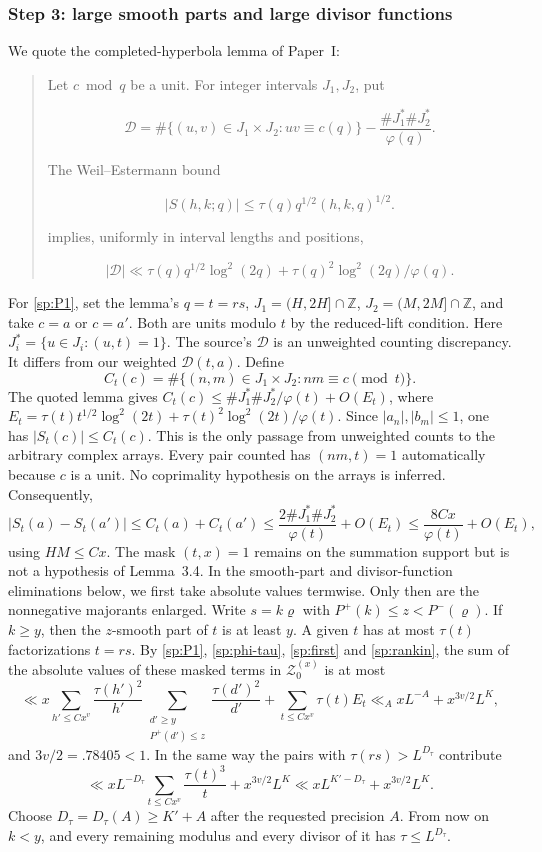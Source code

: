 \subsubsection*{Step 3: large smooth parts and large divisor functions}
We quote the completed-hyperbola lemma of Paper~I:
\begin{quote}
Let $c\bmod q$ be a unit. For integer
intervals $J_1,J_2$, put

\[
\mathcal D=\#\{(u,v)\in J_1\times J_2:uv\equiv c(q)\}
       -\frac{\#J_1^*\#J_2^*}{\varphi(q)}.
\tag{3.107}
\]

The Weil--Estermann bound \cite{Weil48,Estermann61}

\[
|S(h,k;q)|\le\tau(q)q^{1/2}(h,k,q)^{1/2}.
\tag{3.108}
\]

implies, uniformly in interval lengths and positions,

\[
|\mathcal D|\ll\tau(q)q^{1/2}\log^2(2q)
        +\tau(q)^2\log^2(2q)/\varphi(q).
\tag{3.109}
\]
\end{quote}
For \eqref{sp:P1}, set the lemma's $q=t=rs$,
$J_1=(H,2H]\cap\mathbb Z$, $J_2=(M,2M]\cap\mathbb Z$, and take
$c=a$ or $c=a'$. Both are units modulo $t$ by the reduced-lift condition.
Here $J_i^*=\{u\in J_i:(u,t)=1\}$. The source's $\mathcal D$ is an
unweighted counting discrepancy. It differs from our weighted
$\mathcal D(t,a)$. Define
\[
 C_t(c)=\#\{(n,m)\in J_1\times J_2:nm\equiv c\pmod t\}.
\]
The quoted lemma gives
$C_t(c)\le\#J_1^*\#J_2^*/\varphi(t)+O(E_t)$, where
$E_t=\tau(t)t^{1/2}\log^2(2t)+\tau(t)^2\log^2(2t)/\varphi(t)$.
Since $|a_n|,|b_m|\le1$, one has $|S_t(c)|\le C_t(c)$. This is the
only passage from unweighted counts to the arbitrary complex arrays.
Every pair counted has $(nm,t)=1$ automatically because $c$ is a unit.
No coprimality hypothesis on the arrays is inferred. Consequently,
\begin{equation}\label{sp:P1}
 |S_t(a)-S_t(a')|\le C_t(a)+C_t(a')
 \le\frac{2\#J_1^*\#J_2^*}{\varphi(t)}+O(E_t)
 \le\frac{8Cx}{\varphi(t)}+O(E_t),
\end{equation}
using $HM\le Cx$. The mask $(t,x)=1$ remains on the summation
support but is not a hypothesis of Lemma~3.4. In the smooth-part and
divisor-function eliminations below, we first take absolute values
termwise. Only then are the nonnegative majorants enlarged.
Write $s=k\varrho$ with $P^+(k)\le z<P^-(\varrho)$. If $k\ge y$, then the
$z$-smooth part of $t$ is at least $y$. A given $t$ has at most $\tau(t)$
factorizations $t=rs$. By \eqref{sp:P1}, \eqref{sp:phi-tau},
\eqref{sp:first} and \eqref{sp:rankin}, the sum of the absolute values
of these masked terms in $\mathcal Z_0^{(x)}$ is at most
\[
 \ll x\sum_{h'\le Cx^v}\frac{\tau(h')^2}{h'}
 \sum_{\substack{d'\ge y\\P^+(d')\le z}}\frac{\tau(d')^2}{d'}
 +\sum_{t\le Cx^v}\tau(t)E_t
 \ll_AxL^{-A}+x^{3v/2}L^{K},
\]
and $3v/2=.78405<1$. In the same way the pairs with $\tau(rs)>L^{D_\tau}$
contribute
\[
 \ll xL^{-D_\tau}\sum_{t\le Cx^v}\frac{\tau(t)^3}t+x^{3v/2}L^{K}\ll xL^{K'-D_\tau}+x^{3v/2}L^K .
\]
Choose $D_\tau=D_\tau(A)\ge K'+A$ after the requested precision $A$. From now on $k<y$, and every
remaining modulus and every divisor of it has $\tau\le L^{D_\tau}$.

